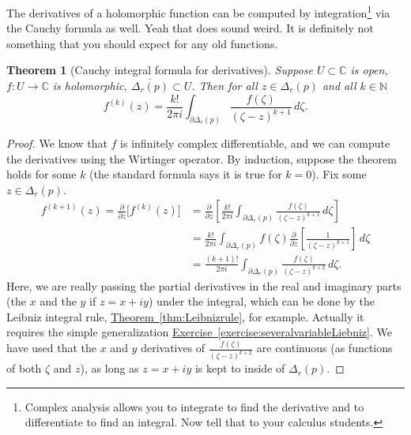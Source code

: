 \documentclass[12pt,openany]{book}
\newcommand{\C}{{\mathbb{C}}}
\newcommand{\N}{{\mathbb{N}}}
\theoremstyle{plain}
\newtheorem{thm}{Theorem}[section]
\theoremstyle{remark}
\theoremstyle{definition}
\theoremstyle{exercise}
\theoremstyle{example}
\newcommand{\exerciseref}[1]{\hyperref[#1]{Exercise~\ref*{#1}}}
\newcommand{\thmref}[1]{\hyperref[#1]{Theorem~\ref*{#1}}}
\begin{document}
The derivatives of a holomorphic function can be computed by
integration\footnote{Complex analysis allows you to integrate to find the
derivative and to differentiate to find an integral.  Now tell that to your
calculus students.} via the Cauchy formula as well.  Yeah that does sound
weird.  It is definitely not something that you should expect for any old
functions.

\begin{thm}[Cauchy integral formula for derivatives]
Suppose $U \subset \C$ is open, $f \colon U \to \C$ is holomorphic,
$\overline{\Delta_r(p)} \subset U$.
Then for all $z \in \Delta_r(p)$ and all $k \in \N$
\begin{equation*}
f^{(k)}(z)
=
\frac{k!}{2\pi i}
\int_{\partial \Delta_r(p)}
\frac{f(\zeta)}{(\zeta-z)^{k+1}}
\,
d \zeta .
\end{equation*}
\end{thm}

\begin{proof}
We know that $f$ is infinitely complex differentiable, and we can compute
the derivatives using the Wirtinger operator.
By induction, suppose the theorem holds for some $k$
(the standard formula says it is true for $k=0$).  Fix some $z \in
\Delta_r(p)$.
\begin{equation*}
\begin{split}
f^{(k+1)}(z)
=
\frac{\partial }{\partial z}
\bigl[ f^{(k)}(z) \bigr]
& =
\frac{\partial }{\partial z}
\left[
\frac{k!}{2\pi i}
\int_{\partial \Delta_r(p)}
\frac{f(\zeta)}{(\zeta-z)^{k+1}}
\,
d \zeta
\right]
\\
& = 
\frac{k!}{2\pi i}
\int_{\partial \Delta_r(p)}
f(\zeta)
\frac{\partial }{\partial z}
\left[
\frac{1}{(\zeta-z)^{k+1}}
\right]
\,
d \zeta
\\
& = 
\frac{(k+1)!}{2\pi i}
\int_{\partial \Delta_r(p)}
\frac{f(\zeta)}{(\zeta-z)^{k+2}}
\,
d \zeta .
\end{split}
\end{equation*}
Here, we are really passing the partial derivatives in the real and
imaginary parts (the $x$ and the $y$ if $z=x+iy$) under the integral,
which can be done by 
the Leibniz integral rule, \thmref{thm:Leibnizrule}, for example.
Actually it requires the simple generalization \exerciseref{exercise:severalvariableLiebniz}.
We have used that the
$x$ and $y$ derivatives of 
$\frac{f(\zeta)}{(\zeta-z)^{k+2}}$ are continuous
(as functions of both $\zeta$ and $z$), as long as $z = x+iy$
is kept to
inside of $\Delta_r(p)$.
\end{proof}
\end{document}
